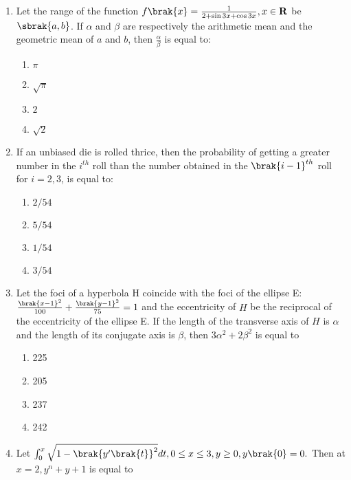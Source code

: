 \iffalse
\title{Assignment}
\author{EE24BTECH11047 - Niketh Prakash Achanta}
\section{mcq-single}
\fi
\begin{enumerate}

    \item Let the range of the function $f\brak{x}=\frac{1}{2+\sin{3x}+\cos{3x}},x\in\mathbf{R}$ be $\sbrak{a, b}$. If $\alpha$ and $\beta$ are respectively the arithmetic mean and the geometric mean of $a$ and $b$, then $\frac{\alpha}{\beta}$ is equal to:
    \begin{enumerate}
        \item $\pi$
        \item $\sqrt{\pi}$
        \item $2$
        \item $\sqrt{2}$
    \end{enumerate}
    \item If an unbiased die is rolled thrice, then the probability of getting a greater number in the $i^{th}$ roll than the number obtained in the $\brak{i-1}^{th}$ roll for $i = 2, 3$, is equal to:
    \begin{enumerate}
        \item $2/54$
        \item $5/54$
        \item $1/54$
        \item $3/54$
    \end{enumerate}
    \item Let the foci of a hyperbola H coincide with the foci of the ellipse E:$\frac{\brak{x-1}^2}{100} + \frac{\brak{y-1}^2}{75} = 1$ and the eccentricity of $H$ be the reciprocal of the eccentricity of the ellipse E. If the length of the transverse axis of $H$ is $\alpha$ and the length of its conjugate axis is $\beta$, then $3\alpha^2 + 2\beta^2$ is equal to
    \begin{enumerate}
        \item 225
        \item 205
        \item 237
        \item 242
    \end{enumerate}
    \item Let $\int_0^x\sqrt{1-\brak{y^{\prime}\brak{t}}^2}dt, 0\leq x \leq 3,y\geq 0,y\brak{0}=0.$ Then at $x=2,y^n+y+1$ is equal to
    \begin{enumerate}

\end{enumerate}
\end{enumerate}
